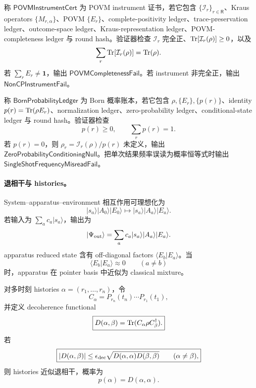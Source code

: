 \begin{definition}\label{def:typed-address-biaxial-completion-povm-instrument-cert}
称 \(\mathsf{POVMInstrumentCert}\) 为 POVM instrument 证书，若它包含 \(\{\mathcal I_r\}_{r\in\mathsf R}\)、Kraus operators \(\{M_{r,\alpha}\}\)、POVM \(\{E_r\}\)、complete-positivity ledger、trace-preservation ledger、outcome-space ledger、Kraus-representation ledger、POVM-completeness ledger 与 round hash。验证器检查 \(\mathcal I_r\) 完全正、\({\rm Tr}[\mathcal I_r(\rho)]\ge0\)，以及
\[
\sum_r{\rm Tr}[\mathcal I_r(\rho)]={\rm Tr}(\rho).
\]
若 \(\sum_rE_r\neq\mathbf1\)，输出 \(\mathsf{POVMCompletenessFail}\)。若 instrument 非完全正，输出 \(\mathsf{NonCPInstrumentFail}\)。
\end{definition}

\begin{definition}\label{def:typed-address-biaxial-completion-born-probability-ledger}
称 \(\mathsf{BornProbabilityLedger}\) 为 Born 概率账本，若它包含 \(\rho,\{E_r\},\{p(r)\}\)、identity \(p(r)={\rm Tr}(\rho E_r)\)、normalization ledger、zero-probability ledger、conditional-state ledger 与 round hash。验证器检查
\[
p(r)\ge0,\qquad \sum_rp(r)=1.
\]
若 \(p(r)=0\)，则 \(\rho_r=\mathcal I_r(\rho)/p(r)\) 未定义，输出 \(\mathsf{ZeroProbabilityConditioningNull}\)。把单次结果频率误读为概率恒等式时输出 \(\mathsf{SingleShotFrequencyMisreadFail}\)。
\end{definition}

\paragraph{退相干与 histories。}
System--apparatus--environment 相互作用可理想化为
\[
|s_a\rangle|A_0\rangle|E_0\rangle
\longmapsto
|s_a\rangle|A_a\rangle|E_a\rangle.
\]
若输入为 \(\sum_ac_a|s_a\rangle\)，输出为
\[
|\Psi_{\rm out}\rangle
=
\sum_ac_a|s_a\rangle|A_a\rangle|E_a\rangle.
\]
apparatus reduced state 含有 off-diagonal factors \(\langle E_b|E_a\rangle\)。当
\[
\langle E_b|E_a\rangle\approx0
\qquad (a\neq b)
\]
时，apparatus 在 pointer basis 中近似为 classical mixture。

对多时刻 histories \(\alpha=(r_1,\ldots,r_n)\)，令
\[
C_\alpha=P_{r_n}(t_n)\cdots P_{r_1}(t_1),
\]
并定义 decoherence functional
\[
\boxed{
D(\alpha,\beta)
=
{\rm Tr}(C_\alpha\rho C_\beta^\dagger).
}
\]
若
\[
\boxed{
|D(\alpha,\beta)|
\le
\epsilon_{\rm dec}
\sqrt{D(\alpha,\alpha)D(\beta,\beta)}
\qquad(\alpha\neq\beta),
}
\]
则 histories 近似退相干，概率为
\[
p(\alpha)=D(\alpha,\alpha).
\]

